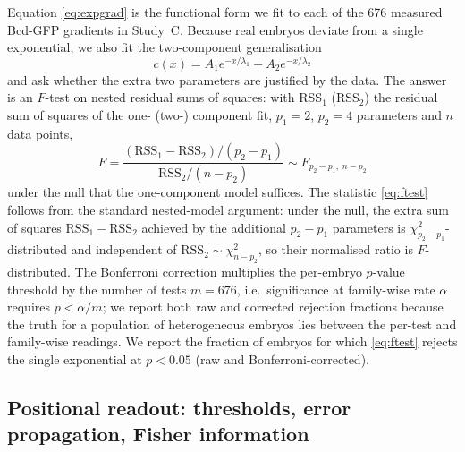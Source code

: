 Equation \eqref{eq:expgrad} is the functional form we fit to each of the 676
measured Bcd-GFP gradients in Study~C. Because real embryos deviate from a
single exponential, we also fit the two-component generalisation
\begin{equation}
c(x) = A_1 e^{-x/\lambda_1} + A_2 e^{-x/\lambda_2}
\label{eq:twocomp}
\end{equation}
and ask whether the extra two parameters are justified by the data. The
answer is an $F$-test on nested residual sums of squares: with
$\mathrm{RSS}_1$ ($\mathrm{RSS}_2$) the residual sum of squares of the one-
(two-) component fit, $p_1 = 2$, $p_2 = 4$ parameters and $n$ data points,
\begin{equation}
F = \frac{(\mathrm{RSS}_1 - \mathrm{RSS}_2)/(p_2 - p_1)}
         {\mathrm{RSS}_2/(n - p_2)}
  \sim F_{p_2 - p_1,\; n - p_2}
\label{eq:ftest}
\end{equation}
under the null that the one-component model suffices. The statistic
\eqref{eq:ftest} follows from the standard nested-model argument: under the
null, the extra sum of squares $\mathrm{RSS}_1 - \mathrm{RSS}_2$ achieved by
the additional $p_2 - p_1$ parameters is $\chi^2_{p_2-p_1}$-distributed and
independent of $\mathrm{RSS}_2 \sim \chi^2_{n-p_2}$, so their normalised
ratio is $F$-distributed. The Bonferroni correction multiplies the per-embryo
$p$-value threshold by the number of tests $m = 676$, i.e.\ significance at
family-wise rate $\alpha$ requires $p < \alpha/m$; we report both raw and
corrected rejection fractions because the truth for a population of
heterogeneous embryos lies between the per-test and family-wise readings. We
report the fraction of embryos for which \eqref{eq:ftest} rejects the single
exponential at $p < 0.05$ (raw and Bonferroni-corrected).

\subsection{Positional readout: thresholds, error propagation, Fisher information}
\label{sec:math-readout}

